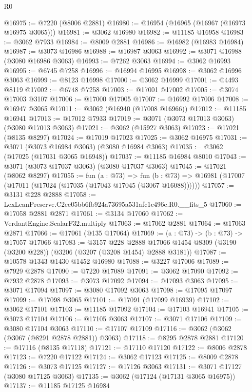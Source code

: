 \begin{lexlean}{R0}
\begin{coremodule}
@16975 := @7220 (@8006 @2881)
@16980 := @16954 (@16965 (@16967 (@16973 @16975 @3065)))
@16981 := @3062 @16980
@16982 := @11185 @16958
@16983 := @3062 @7933
@16984 := @8009 @2881
@16986 := @16982 (@16983 @16984)
@16987 := @3073 @16986
@16988 := @16987 @3063
@16992 := @3071 @16988 (@3080 @16986 @3063)
@16993 := @7262 @3063
@16994 := @3062 @16993
@16995 := @6745 @7258
@16996 := @16994 @16995
@16998 := @3062 @16996 @3063
@16999 := @8123 @16998
@17000 := @3062 @16999
@17001 := @4493 @8119
@17002 := @6748 @7258
@17003 := @17001 @17002
@17005 := @3074 @17003 @3107
@17006 := @17000 @17005
@17007 := @16992 @17006
@17008 := @16947 @3065
@17011 := @3062 (@16940 (@17008 @16966))
@17012 := @11185 @16941
@17013 := @17012 @7933
@17019 := @3071 (@3073 @17013 @3063) (@3080 @17013 @3063)
@17021 := @3062 (@15927 @3063)
@17023 := @17021 (@8135 @8297)
@17024 := @17019 @17023
@17025 := @3062 @16975
@17031 := @3071 (@3073 @16984 @3063) (@3080 @16984 @3063)
@17035 := @3062 (@17025 (@17031 @3065 @16948))
@17037 := @11185 @16984 @8010
@17043 := @3071 (@3073 @17037 @3063) (@3080 @17037 @3063)
@17045 := @17021 (@8062 @8297)
@17055 := fun (a : @73) =>
  fun (b : @73) => @16981 (@17007 (@17011 (@17024 (@17035 (@17043 @17045 (@3067 @16088))))))
@17057 := @3131 @228 @2888
@17058 := LexLeanPreserve.C2ee05bb6fb924a73695a531afc1e496e.R0.__fits_5
@17060 := @17058 @2881 @2871
@17061 := @3134 @17060
@17062 := VerdantEngine.ScalarF32.multiply
@17063 := @17062 @2881
@17064 := @17063 @2871
@17066 := @17061 (@135 @17064)
@17069 := (a : @73) -> (b : @73) -> @17057 @17066
@17083 := @3157
    @228
    @2888
    @17066
    @1454
    @8309
    (@3190 (@3200 @228))
    (@3206 (@3207 (@3208 @1454) @2888 @3181))
@17087 := @10578 @1343 @1430 @1452 @16980
@17088 := @3227 @17006
@17089 := @7929 @2878
@17090 := @7220 @17089
@17091 := @3062 @17090
@17092 := @7932 @2878
@17093 := @3073 @17092
@17094 := @17093 @3063
@17095 := @3071 @17094
@17097 := @3080 @17092 @3063
@17098 := @17095 @17097
@17099 := @17098 @3065
@17101 := @17091 (@17099 @16939)
@17102 := @3062 @17101
@17103 := @11185 @17092
@17104 := @17103 @16941
@17105 := @3073 @17104
@17106 := @17105 @3063
@17107 := @3071 @17106
@17109 := @3080 @17104 @3063
@17110 := @17107 @17109
@17116 := @3062 (@3062 (@3067 (@8291 @2878 @2881)) @3063)
@17118 := @8295 @2878 @2881
@17120 := @17116 (@8135 @17118)
@17121 := @17110 @17120
@17122 := @8006 @2878
@17123 := @7220 @17122
@17124 := @3062 @17123
@17125 := @8009 @2878
@17126 := @3073 @17125
@17127 := @17126 @3063
@17131 := @3071 @17127 (@3080 @17125 @3063)
@17135 := @3062 (@17124 (@17131 @3065 @16975))
@17137 := @11185 @17125 @16984

\end{coremodule}
\end{lexlean}

